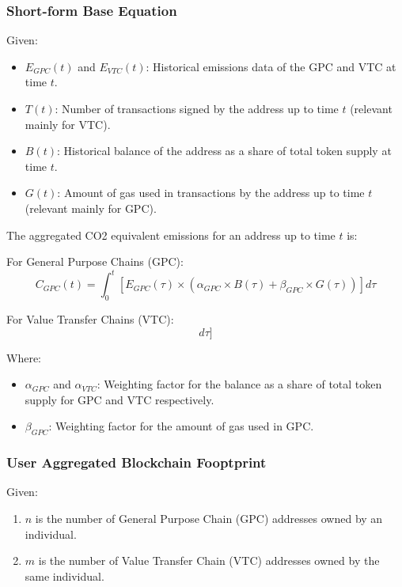 \documentclass[12pt]{article}
\begin{document}
\subsubsection{Short-form Base Equation}
Given:
\begin{itemize}
    \item $E_{GPC}(t)$ and $E_{VTC}(t)$: Historical emissions data of the GPC and VTC at time $t$.
    \item $T(t)$: Number of transactions signed by the address up to time $t$ (relevant mainly for VTC).
    \item $B(t)$: Historical balance of the address as a share of total token supply at time $t$.
    \item $G(t)$: Amount of gas used in transactions by the address up to time $t$ (relevant mainly for GPC).
\end{itemize}

The aggregated CO2 equivalent emissions for an address up to time $t$ is:

For General Purpose Chains (GPC):
\begin{equation}
    C_{GPC}(t) = \int_{0}^{t} [E_{GPC}(\tau) \times (\alpha_{GPC} \times B(\tau) + \beta_{GPC} \times G(\tau))] d\tau
\end{equation}

For Value Transfer Chains (VTC):
\begin{equation}
    [ C_{VTC}(t) = \int_{0}^{t} [E_{VTC}(\tau) \times (\alpha_{VTC} \times B(\tau) + \gamma_{VTC} \times T(\tau))] d\tau ]
\end{equation}

Where:
\begin{itemize}
    \item $\alpha_{GPC}$ and $\alpha_{VTC}$: Weighting factor for the balance as a share of total token supply for GPC and VTC respectively.
    \item $\beta_{GPC}$: Weighting factor for the amount of gas used in GPC.
\end{itemize}

\subsubsection{User Aggregated Blockchain Fooptprint}

Given:
\begin{enumerate}
    \item  \( n \) is the number of General Purpose Chain (GPC) addresses owned by an individual. 
    \item \( m \) is the number of Value Transfer Chain (VTC) addresses owned by the same individual.
\end{enumerate}
\end{document}
